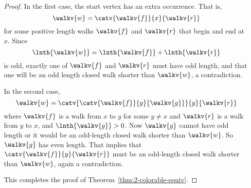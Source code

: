 \begin{description}
\begin{proof}
In the first case, the start vertex has an extra occurrence.  That is,
\[
\walkv{w} = \catv{\walkv{f}}{x}{\walkv{r}}
\]
for some positive length walks $\walkv{f}$ and $\walkv{r}$ that begin and
end at $x$.  Since
\[
\lnth{\walkv{w}} =  \lnth{\walkv{f}}+ \lnth{\walkv{r}}
\]
is odd, exactly one of $\walkv{f}$ and $\walkv{r}$ must have odd length,
and that one will be an odd length closed walk shorter than $\walkv{w}$, a
contradiction.

In the second case,
\[
\walkv{w} = \catv{\catv{\walkv{f}}{y}{\walkv{g}}}{y}{\walkv{r}}
\]
where $\walkv{f}$ is a walk from $x$ to $y$ for some $y \neq x$ and
$\walkv{r}$ is a walk from $y$ to $x$, and $\lnth{\walkv{g}} > 0$.
Now $\walkv{g}$ cannot have odd length or it would be an odd-length
closed walk shorter than $\walkv{w}$.  So $\walkv{g}$ has even length.
That implies that $\catv{\walkv{f}}{y}{\walkv{r}}$ must be an
odd-length closed walk shorter than $\walkv{w}$, again a
contradiction.

This completes the proof of Theorem~\ref{thm:2-colorable-equiv}.
\end{proof}
\end{description}


